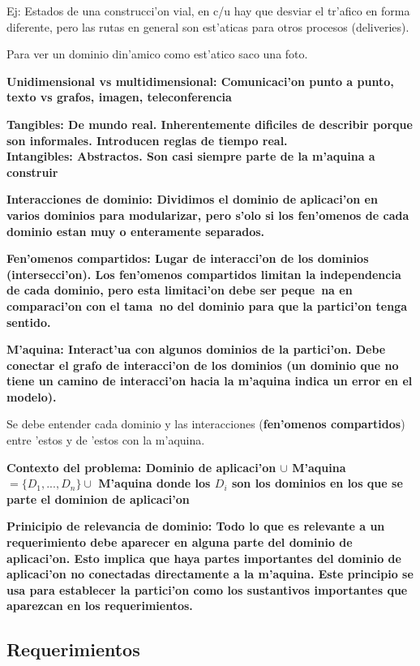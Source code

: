 \documentclass[a4paper,spanish]{article}
\newcommand{\defi}[2]{\bfseries #1: \mdseries #2}
\begin{document}
Ej: Estados de una construcci'on vial, en c/u hay que desviar el tr'afico en forma diferente, pero
las rutas en general son est'aticas para otros procesos (deliveries).

Para ver un dominio din'amico como est'atico saco una foto.

\defi{Unidimensional vs multidimensional}{Comunicaci'on punto a punto, texto vs grafos, imagen, teleconferencia}

\defi{Tangibles}{De mundo real. Inherentemente dificiles de describir porque son informales. Introducen reglas
de tiempo real.} \\
\defi{Intangibles}{Abstractos. Son casi siempre parte de la m'aquina a construir}

\defi{Interacciones de dominio}{Dividimos el dominio de aplicaci'on en varios dominios para modularizar,
pero s'olo si los \textbf{fen'omenos} de cada dominio estan muy o enteramente separados.}

\defi{Fen'omenos compartidos}{Lugar de interacci'on de los dominios (intersecci'on). Los fen'omenos compartidos
limitan la independencia de cada dominio, pero esta limitaci'on debe ser peque~na en comparaci'on con el tama~no
del dominio para que la partici'on tenga sentido.}

\defi{M'aquina}{Interact'ua con algunos dominios de la partici'on. Debe conectar el grafo de interacci'on
de los dominios (un dominio que no tiene un camino de interacci'on hacia la m'aquina indica un error en el
modelo).}

Se debe entender cada dominio y las interacciones (\textbf{fen'omenos compartidos}) entre 'estos y de 'estos
con la m'aquina.

\defi{Contexto del problema}{Dominio de aplicaci'on $\cup$ M'aquina $= \{D_1,...,D_n\} \cup$ M'aquina donde 
los $D_i$ son los dominios en los que se parte el dominion de aplicaci'on}

\defi{Prinicipio de relevancia de dominio}{Todo lo que es relevante a un \textbf{requerimiento} debe aparecer
en alguna parte del dominio de aplicaci'on. Esto implica que haya partes importantes del dominio de aplicaci'on
no conectadas directamente a la m'aquina. Este principio se usa para establecer la partici'on como los 
sustantivos importantes que aparezcan en los \textbf{requerimientos}.}

\subsection{Requerimientos}
\end{document}
